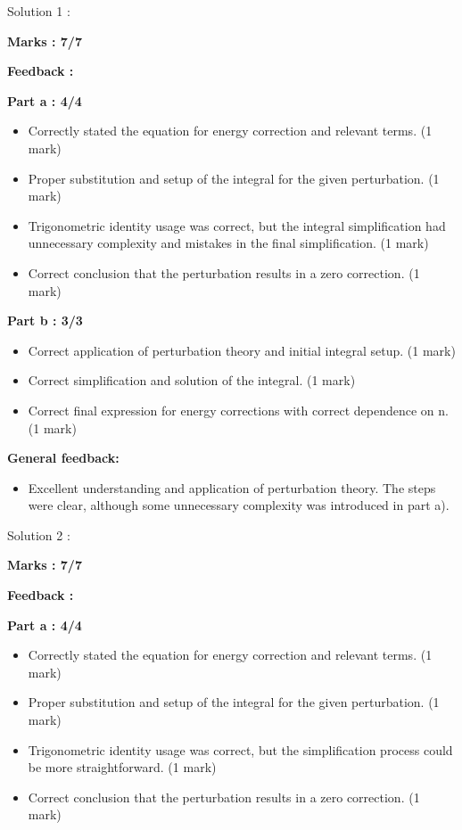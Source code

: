 \documentclass[a4paper,11pt]{article}
\begin{document}
Solution 1 :

\textbf{Marks : 7/7}

\textbf{Feedback :}

\textbf{Part a : 4/4}

\begin{itemize}
    \item Correctly stated the equation for energy correction and relevant terms. (1 mark)
    \item Proper substitution and setup of the integral for the given perturbation. (1 mark)
    \item Trigonometric identity usage was correct, but the integral simplification had unnecessary complexity and mistakes in the final simplification. (1 mark)
    \item Correct conclusion that the perturbation results in a zero correction. (1 mark)
\end{itemize}


\textbf{Part b : 3/3}

\begin{itemize}
    \item Correct application of perturbation theory and initial integral setup. (1 mark)
    \item Correct simplification and solution of the integral. (1 mark)
    \item Correct final expression for energy corrections with correct dependence on n. (1 mark)
\end{itemize}

\textbf{General feedback:}

\begin{itemize}
    \item Excellent understanding and application of perturbation theory. The steps were clear, although some unnecessary complexity was introduced in part a).
\end{itemize}



Solution 2 :

\textbf{Marks : 7/7}

\textbf{Feedback :}

\textbf{Part a : 4/4}

\begin{itemize}
    \item Correctly stated the equation for energy correction and relevant terms. (1 mark)
    \item Proper substitution and setup of the integral for the given perturbation. (1 mark)
    \item Trigonometric identity usage was correct, but the simplification process could be more straightforward. (1 mark)
    \item Correct conclusion that the perturbation results in a zero correction. (1 mark)
\end{itemize}
\end{document}

